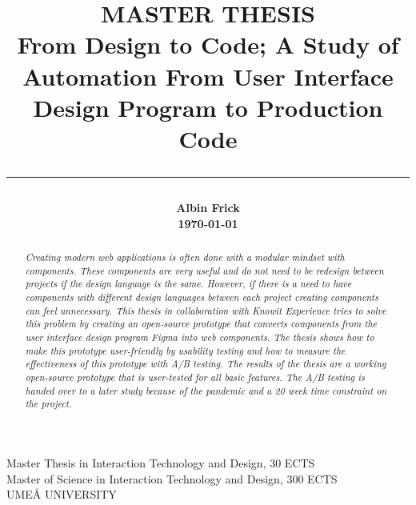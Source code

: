 \title{
    \Large MASTER THESIS\\
    \vspace{5mm}
    \huge \bf
        From Design to Code; A Study of Automation From User Interface Design Program to Production Code\\
        \noindent\rule{\textwidth}{0.4pt}

}

\date{} %
\author{
    \LARGE\bf{Albin Frick}\\
    \today
}

\maketitle
\vspace*{\fill}
\begin{center}
Master Thesis in Interaction Technology and Design, 30 ECTS\\
Master of Science in Interaction Technology and Design, 300 ECTS\\
UMEÅ UNIVERSITY
\end{center}
\newpage
\tableofcontents
\newpage
{}
\begin{abstract}
\textit{Creating modern web applications is often done with a modular mindset with components. These components are very useful and do not need to be redesign between projects if the design language is the same. However, if there is a need to have components with different design languages between each project creating components can feel unnecessary. This thesis in collaboration with Knowit Experience tries to solve this problem by creating an open-source prototype that converts components from the user interface design program Figma into web components. The thesis shows how to make this prototype user-friendly by usability testing and how to measure the effectiveness of this prototype with A/B testing. The results of the thesis are a working open-source prototype that is user-tested for all basic features. The A/B testing is handed over to a later study because of the pandemic and a 20 week time constraint on the project.}

\end{abstract}
\newpage
